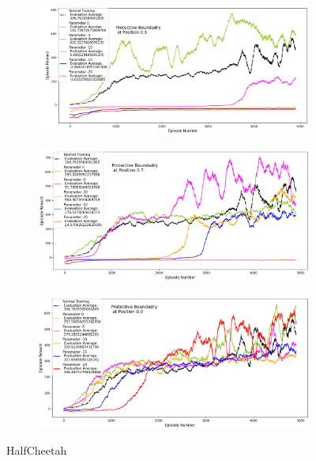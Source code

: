\documentclass[journal]{IEEEtran}
\begin{document}
\begin{figure}
    \centering
    \begin{subfigure}[b]{0.5\textwidth}
      \centering
      \includegraphics[width=\textwidth]{Walker_with_Boundary_at_0.3.png}
    \end{subfigure}
    \vspace*{0.0mm}
    \begin{subfigure}[b]{0.5\textwidth}
      \centering
      \includegraphics[width=\textwidth]{Walker_with_Boundary_at_0.7.png}
    \end{subfigure}
    \vspace*{0.0mm}
    \begin{subfigure}[b]{0.5\textwidth}
      \centering
      \includegraphics[width=\textwidth]{Walker_with_Boundary_at_0.9.png}
    \end{subfigure}
    \caption{HalfCheetah}
    \label{fig:Cheetah}
\end{figure}
\end{document}
